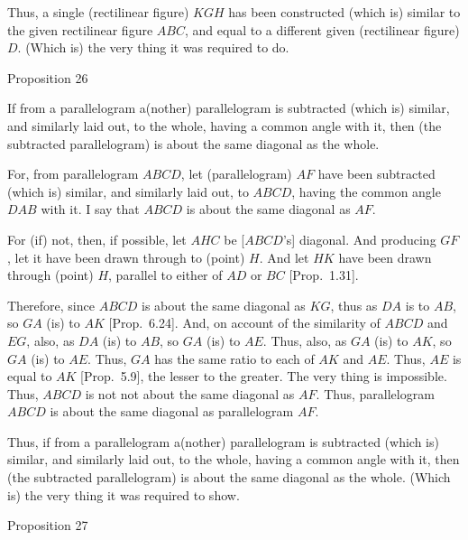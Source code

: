 Thus, a single (rectilinear figure) $KGH$ has been constructed (which is)
similar to the given rectilinear figure $ABC$, and equal to a different
given (rectilinear figure) $D$. (Which is) the very thing it was required to do.


\begin{center}
{\large Proposition 26}
\end{center}

If from a parallelogram a(nother) parallelogram
is subtracted (which is) similar, and similarly laid out, to the whole,
having a common angle with it, then (the subtracted parallelogram) is about the same diagonal
as the whole. 

For, from parallelogram $ABCD$, let (parallelogram) $AF$ have been
subtracted (which is) similar, and similarly laid out,  to $ABCD$,
having  the common angle $DAB$ with it. I say that $ABCD$ is about
the same diagonal as $AF$.

\epsfysize=2in
\centerline{}

For (if) not, then, if possible, let $AHC$ be [$ABCD$'s] diagonal. And producing
$GF$, let it have been drawn through to (point) $H$. And let $HK$ have
been drawn through (point) $H$, parallel to either of $AD$ or $BC$  [Prop.~1.31].

Therefore, since $ABCD$ is about the same diagonal as $KG$, thus as
$DA$ is to $AB$, so $GA$ (is) to $AK$ [Prop.~6.24].
And, on account of the similarity of $ABCD$ and $EG$, also, as $DA$ (is)
to $AB$, so $GA$ (is) to $AE$. Thus, also, as $GA$ (is) to $AK$, so $GA$ (is)
to $AE$. Thus, $GA$ has the same ratio  to each of $AK$ and $AE$. Thus, 
$AE$ is equal to $AK$ [Prop.~5.9], the
lesser to the greater. The very thing is impossible. Thus, $ABCD$ is not not
about the same diagonal as $AF$. Thus, parallelogram $ABCD$ is
about the same diagonal as parallelogram $AF$.

Thus, if from a parallelogram a(nother) parallelogram
is subtracted (which is) similar, and similarly laid out, to the whole,
having a common angle with it, then (the subtracted parallelogram) is about the same diagonal
as the whole. (Which is) the very thing it was required to show.


\begin{center}
{\large Proposition 27}
\end{center}

